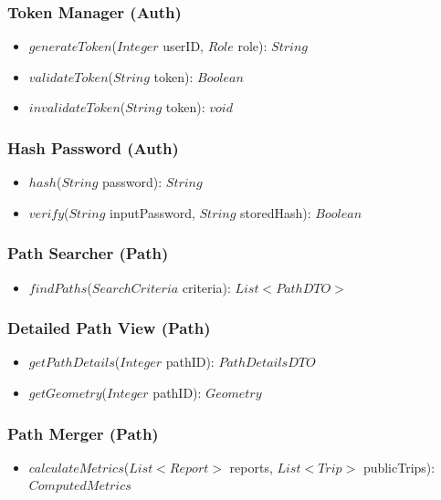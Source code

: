 \subsubsection*{Token Manager (Auth)}
\begin{itemize}
    \item $generateToken$($Integer$ userID, $Role$ role): $String$
    \item $validateToken$($String$ token): $Boolean$
    \item $invalidateToken$($String$ token): $void$
\end{itemize}

\subsubsection*{Hash Password (Auth)}
\begin{itemize}
    \item $hash$($String$ password): $String$
    \item $verify$($String$ inputPassword, $String$ storedHash): $Boolean$
\end{itemize}

\subsubsection*{Path Searcher (Path)}
\begin{itemize}
    \item $findPaths$($SearchCriteria$ criteria): $List<PathDTO>$
\end{itemize}

\subsubsection*{Detailed Path View (Path)}
\begin{itemize}
    \item $getPathDetails$($Integer$ pathID): $PathDetailsDTO$
    \item $getGeometry$($Integer$ pathID): $Geometry$
\end{itemize}

\subsubsection*{Path Merger (Path)}
\begin{itemize}
    \item $calculateMetrics$($List<Report>$ reports, $List<Trip>$ publicTrips): $ComputedMetrics$
\end{itemize}

